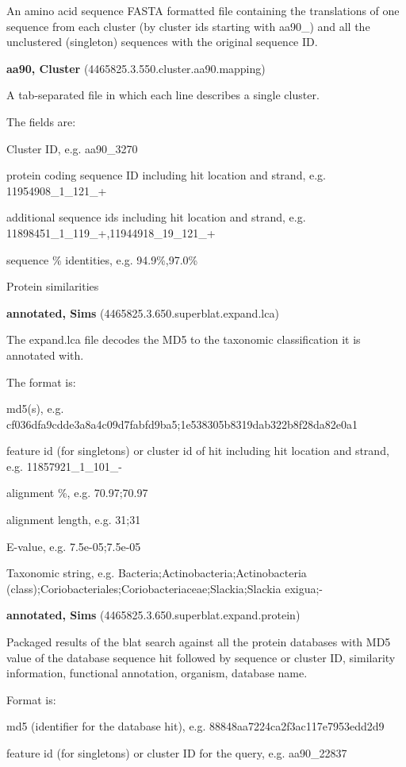 \documentclass[12pt,fullpage]{report}
\begin{document}
\begin{appendices}
\begin{mdframed}
An amino acid sequence FASTA formatted file containing the translations of one sequence from each cluster (by cluster ids starting with aa90\_) and all the unclustered (singleton) sequences with the original sequence ID.

\textbf{aa90, Cluster} (4465825.3.550.cluster.aa90.mapping)

A tab-separated file in which each line describes a single cluster.

The fields are:

    Cluster ID, e.g. aa90\_3270

    protein coding sequence ID including hit location and strand, e.g. 11954908\_1\_121\_+

    additional sequence ids including hit location and strand, e.g. 11898451\_1\_119\_+,11944918\_19\_121\_+

    sequence \% identities, e.g. 94.9\%,97.0\%

Protein similarities

\textbf{annotated, Sims} (4465825.3.650.superblat.expand.lca)

The expand.lca file decodes the \gls{MD5} to the taxonomic classification it is annotated with.

The format is:

    md5(s), e.g. cf036dfa9cdde3a8a4c09d7fabfd9ba5;1e538305b8319dab322b8f28da82e0a1

    feature id (for singletons) or cluster id of hit including hit location and strand, e.g. 11857921\_1\_101\_-

    alignment \%, e.g. 70.97;70.97

    alignment length, e.g. 31;31

    E-value, e.g. 7.5e-05;7.5e-05

    Taxonomic string, e.g. Bacteria;Actinobacteria;Actinobacteria (class);Coriobacteriales;Coriobacteriaceae;Slackia;Slackia exigua;-

\textbf{annotated, Sims} (4465825.3.650.superblat.expand.protein)

Packaged results of the blat search against all the protein databases with \gls{MD5} value of the database sequence hit followed by sequence or cluster ID, similarity information, functional annotation, organism, database name.

Format is:

    md5 (identifier for the database hit), e.g. 88848aa7224ca2f3ac117e7953edd2d9

    feature id (for singletons) or cluster ID for the query, e.g. aa90\_22837


\end{mdframed}
\end{appendices}
\end{document}
